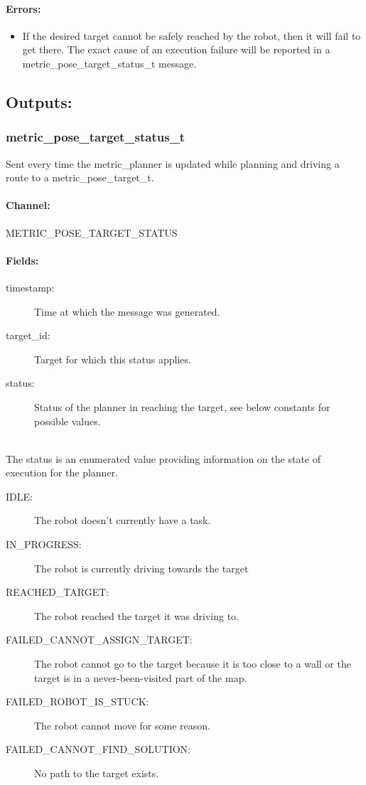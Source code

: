 \documentclass{article}
\begin{document}
\paragraph{Errors:}

\begin{itemize}
  \item If the desired target cannot be safely reached by the robot, then it will fail to get there. The exact cause of 
an execution failure will be reported in a metric\_pose\_target\_status\_t message.
\end{itemize}


\subsection{Outputs:}

\subsubsection{metric\_pose\_target\_status\_t}

Sent every time the metric\_planner is updated while planning and driving a route to a metric\_pose\_target\_t.

\paragraph{Channel:} 

METRIC\_POSE\_TARGET\_STATUS

\paragraph{Fields:}

\begin{description}
    \item[timestamp:] Time at which the message was generated.
    \item[target\_id:] Target for which this status applies.
    \item[status:] Status of the planner in reaching the target, see below constants for possible values.
\end{description}

\hfill
\\
The status is an enumerated value providing information on the state of execution for the planner.
\begin{description}
    \item[IDLE:] The robot doesn't currently have a task.
    \item[IN\_PROGRESS:] The robot is currently driving towards the target
    \item[REACHED\_TARGET:] The robot reached the target it was driving to.
    \item[FAILED\_CANNOT\_ASSIGN\_TARGET:] The robot cannot go to the target because it is too close to a wall or the 
target is in a never-been-visited part of the map.
    \item[FAILED\_ROBOT\_IS\_STUCK:] The robot cannot move for some reason.
    \item[FAILED\_CANNOT\_FIND\_SOLUTION:] No path to the target exists.
\end{description}
\end{document}
